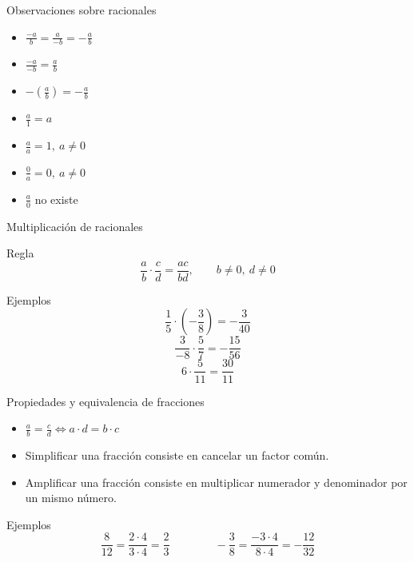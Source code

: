 \documentclass[handout,aspectratio=169,10pt]{beamer}
\begin{document}
	\begin{frame}{Observaciones sobre racionales}
		\begin{itemize}[<+->]
			\item \(\displaystyle \frac{-a}{b}=\frac{a}{-b}=-\frac{a}{b}\)
			\item \(\displaystyle \frac{-a}{-b}=\frac{a}{b}\)
			\item \(\displaystyle -\left(\frac{a}{b}\right)=-\frac{a}{b}\)
			\item \(\displaystyle \frac{a}{1}=a\)
			\item \(\displaystyle \frac{a}{a}=1,\ a\neq0\)
			\item \(\displaystyle \frac{0}{a}=0,\ a\neq0\)
			\item \(\displaystyle \frac{a}{0}\) no existe
		\end{itemize}
	\end{frame}
	
	\begin{frame}{Multiplicación de racionales}
		\begin{block}{Regla}
			\[
			\frac{a}{b}\cdot\frac{c}{d}=\frac{ac}{bd},\qquad b\neq0,\ d\neq0
			\]
		\end{block}
		
		\begin{exampleblock}{Ejemplos}
			\[
			\frac15\cdot\left(-\frac38\right)=-\frac3{40}
			\]
			\[
			\frac3{-8}\cdot\frac57=-\frac{15}{56}
			\]
			\[
			6\cdot\frac{5}{11}=\frac{30}{11}
			\]
		\end{exampleblock}
	\end{frame}
	
	\begin{frame}{Propiedades y equivalencia de fracciones}
		\begin{itemize}[<+->]
			\item \(\displaystyle \frac{a}{b}=\frac{c}{d}\iff a\cdot d=b\cdot c\)
			\item Simplificar una fracción consiste en cancelar un factor común.
			\item Amplificar una fracción consiste en multiplicar numerador y denominador por un mismo número.
		\end{itemize}
		
		\begin{exampleblock}{Ejemplos}
			\[
			\frac{8}{12}=\frac{2\cdot4}{3\cdot4}=\frac23
			\qquad\qquad
			-\frac38=\frac{-3\cdot4}{8\cdot4}=-\frac{12}{32}
			\]
		\end{exampleblock}
	\end{frame}
	
\end{document}

